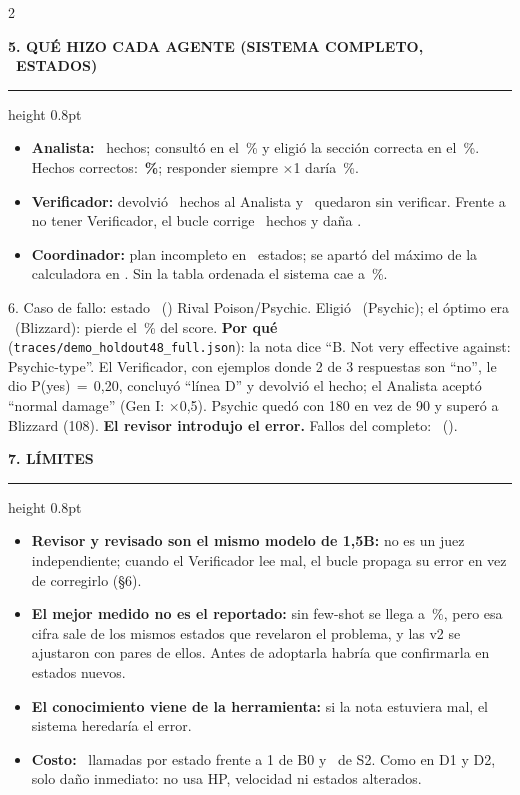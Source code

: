\documentclass[10pt,a4paper]{extarticle}
\newcommand{\heading}[1]{%
  \par\vspace{0.8mm}\noindent
  {\color{navy}\bfseries\MakeUppercase{#1}}\par\vspace{0.2mm}
  {\color{amber}\hrule height 0.8pt}\vspace{0.6mm}\noindent\ignorespaces}
\begin{document}
\begin{multicols}{2}
\heading{5. Qu\'e hizo cada agente (sistema completo, \nAll\ estados)}
\begin{itemize}
\item \textbf{Analista:} \nFacts\ hechos; consult\'o en el \lookupPct\,\% y eligi\'o la secci\'on correcta en el \rightSection\,\%. Hechos correctos: \textbf{\factsRight\,\%}; responder siempre $\times$1 dar\'ia \alwaysOne\,\%.
\item \textbf{Verificador:} devolvi\'o \nRevised\ hechos al Analista y \nUnverified\ quedaron sin verificar. Frente a no tener Verificador, el bucle corrige \loopFixed\ hechos y da\~na \loopBroken.
\item \textbf{Coordinador:} plan incompleto en \nPlanMissed\ estados; se apart\'o del m\'aximo de la calculadora en \nDeviated. Sin la tabla ordenada el sistema cae a \accNoRankA\,\%.
\end{itemize}

\begin{failbox}{6. Caso de fallo: estado \fcId\ (\fcDiff)}
\footnotesize Rival Poison/Psychic. Eligi\'o \fcChosen\ (Psychic); el \'optimo era \fcRef\ (Blizzard): pierde el \fcRegret\,\% del score. \textbf{Por qu\'e} (\texttt{traces/demo\_holdout48\_full.json}): la nota dice ``B. Not very effective against: Psychic-type''. El Verificador, con ejemplos donde 2 de 3 respuestas son ``no'', le dio P(yes)$\,{=}\,$0{,}20, concluy\'o ``l\'inea D'' y devolvi\'o el hecho; el Analista acept\'o ``normal damage'' (Gen I: $\times$0{,}5). Psychic qued\'o con 180 en vez de 90 y super\'o a Blizzard (108). \textbf{El revisor introdujo el error.} Fallos del completo: \nFail\ (\failCauses).
\end{failbox}

\heading{7. L\'imites}
\begin{itemize}
\item \textbf{Revisor y revisado son el mismo modelo de 1{,}5B:} no es un juez independiente; cuando el Verificador lee mal, el bucle propaga su error en vez de corregirlo (\S6).
\item \textbf{El mejor medido no es el reportado:} sin few-shot se llega a \accNoFewA\,\%, pero esa cifra sale de los mismos estados que revelaron el problema, y las v2 se ajustaron con pares de ellos. Antes de adoptarla habr\'ia que confirmarla en estados nuevos.
\item \textbf{El conocimiento viene de la herramienta:} si la nota estuviera mal, el sistema heredar\'ia el error.
\item \textbf{Costo:} \callsFull\ llamadas por estado frente a 1 de B0 y \callsStwo\ de S2. Como en D1 y D2, solo da\~no inmediato: no usa HP, velocidad ni estados alterados.
\end{itemize}
\end{multicols}
\end{document}
